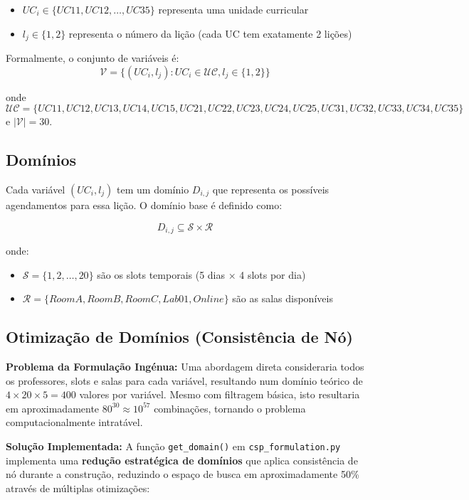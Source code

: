 \documentclass[a4paper, 12pt]{article}
\begin{document}
\begin{itemize}
    \item $UC_i \in \{UC11, UC12, \ldots, UC35\}$ representa uma unidade curricular
    \item $l_j \in \{1, 2\}$ representa o número da lição (cada UC tem exatamente 2 lições)
\end{itemize}

Formalmente, o conjunto de variáveis é:
$$\mathcal{V} = \{(UC_i, l_j) : UC_i \in \mathcal{UC}, l_j \in \{1, 2\}\}$$

onde $\mathcal{UC} = \{UC11, UC12, UC13, UC14, UC15, UC21, UC22, UC23, UC24, UC25, UC31, UC32, UC33, UC34, UC35\}$ e $|\mathcal{V}| = 30$.

\subsection{Domínios}

Cada variável $(UC_i, l_j)$ tem um domínio $D_{i,j}$ que representa os possíveis agendamentos para essa lição. O domínio base é definido como:

$$D_{i,j} \subseteq \mathcal{S} \times \mathcal{R}$$

onde:
\begin{itemize}
    \item $\mathcal{S} = \{1, 2, \ldots, 20\}$ são os slots temporais (5 dias × 4 slots por dia)
    \item $\mathcal{R} = \{RoomA, RoomB, RoomC, Lab01, Online\}$ são as salas disponíveis
\end{itemize}

\subsection{Otimização de Domínios (Consistência de Nó)}

\textbf{Problema da Formulação Ingénua:} Uma abordagem direta consideraria todos os professores, slots e salas para cada variável, resultando num domínio teórico de $4 \times 20 \times 5 = 400$ valores por variável. Mesmo com filtragem básica, isto resultaria em aproximadamente $80^{30} \approx 10^{57}$ combinações, tornando o problema computacionalmente intratável.

\textbf{Solução Implementada:} A função \texttt{get\_domain()} em \texttt{csp\_formulation.py} implementa uma \textbf{redução estratégica de domínios} que aplica consistência de nó durante a construção, reduzindo o espaço de busca em aproximadamente 50\% através de múltiplas otimizações:
\end{document}
